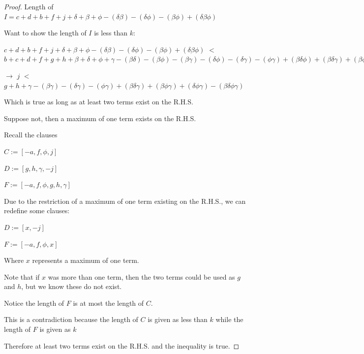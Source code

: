 \documentclass[manuscript]{acmart}
\begin{document}
\begin{proof}
        Length of $I = c + d + b + f + j
        + \delta + \beta + \phi
        - (\delta \beta) - (\delta \phi) - (\beta \phi)
        + (\delta \beta \phi)
        $

        Want to show the length of $I$ is less than $k$:

        $c + d + b + f + j
        + \delta + \beta + \phi
        - (\delta \beta) - (\delta \phi) - (\beta \phi)
        + (\delta \beta \phi)
        $
        $<$
        $b + c + d + f + g + h
            + \beta + \delta + \phi + \gamma
            - (\beta \delta) - (\beta \phi) - (\beta \gamma) - (\delta \phi) - (\delta \gamma) -(\phi \gamma)
            + (\beta \delta \phi) + (\beta \delta \gamma) + (\beta \phi \gamma) + (\delta \phi \gamma)
            - (\beta \delta \phi \gamma)
        $

        $\rightarrow$
        $j
        $
        $<$
        $g + h
            + \gamma
            - (\beta \gamma) - (\delta \gamma) -(\phi \gamma)
            + (\beta \delta \gamma) + (\beta \phi \gamma) + (\delta \phi \gamma)
            - (\beta \delta \phi \gamma)
        $

        Which is true as long as at least two terms exist on the R.H.S.

        Suppose not, then a maximum of one term exists on the R.H.S.

        Recall the clauses

        $C := [-a, f, \phi, j]$

        $D := [g, h, \gamma, -j]$

        $F := [-a, f, \phi, g, h, \gamma]$

        Due to the restriction of a maximum of one term existing on the R.H.S., we can redefine some clauses:

        $D := [x, -j]$

        $F := [-a, f, \phi, x]$

        Where $x$ represents a maximum of one term.

        Note that if $x$ was more than one term, then the two terms could be used as $g$ and $h$, but we know these do not exist.

        Notice the length of $F$ is at most the length of $C$.

        This is a contradiction because the length of $C$ is given as less than $k$ while the length of $F$ is given as $k$

        Therefore at least two terms exist on the R.H.S. and the inequality is true.


\end{proof}
\end{document}
